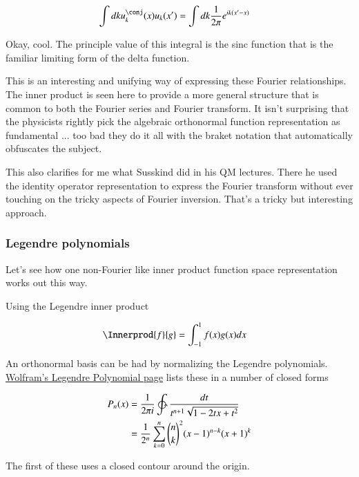 \documentclass{article}
\begin{document}
\begin{align*}
\int dk u_k^\conj(x) u_k(x')
&=
\int dk \inv{2\pi} e^{ i k (x' - x)}
\end{align*}

Okay, cool.  The principle value of this integral is the sinc function
that is the familiar limiting form of the delta function.

This is an interesting and unifying way of expressing these Fourier 
relationships.  The inner product is seen here to provide a more general
structure that is common to both the Fourier series and Fourier transform.
It isn't surprising that the physicists rightly pick the algebraic
orthonormal function representation as fundamental ... too bad they do it
all with the braket notation that automatically obfuscates the subject.

This also clarifies for me what Susskind did in his QM lectures.  There
he used the identity operator representation to express the Fourier transform
without ever touching on the tricky aspects of Fourier inversion.  That's a
tricky but interesting approach.

\subsubsection{Legendre polynomials }

Let's see how one non-Fourier like inner product function space 
representation works out this way.

Using the Legendre inner product

\begin{align*}
\Innerprod{f}{g} &= \int_{-1}^1 f(x) g(x) dx
\end{align*}

An orthonormal basis can be had by normalizing the 
Legendre polynomials.  
\href{ http://mathworld.wolfram.com/LegendrePolynomial.html }{Wolfram's Legendre Polynomial page} lists these in a number of closed forms

\begin{align*}
P_n(x) 
&= \inv{2 \pi i} \ointctrclockwise \frac{dt}{t^{n+1}\sqrt{1 - 2t x +t^2}} \\
&= \inv{2^n}\sum_{k=0}^n {\binom{n}{k}}^2 (x-1)^{n-k}(x+1)^k
\end{align*}

The first of these uses a closed contour around the origin.
\end{document}
